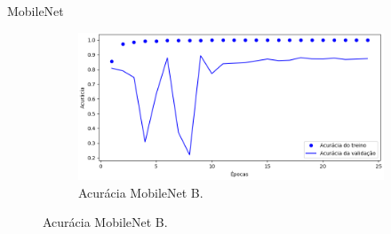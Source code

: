 \begin{frame}{MobileNet}
\begin{figure}[h!]
\begin{subfigure}{0.3\linewidth}
    \end{subfigure}
    \hspace{1.5cm}
    \begin{subfigure}{0.3\linewidth}
      \caption{Acurácia MobileNet B.\label{subfig:alexnet-b-acc}}
      \includegraphics[width=\linewidth]{img/mobilenet-b-acc}%
    \end{subfigure}
    \label{fig:treinamento-alexnet}
  \end{figure}
\end{frame}

